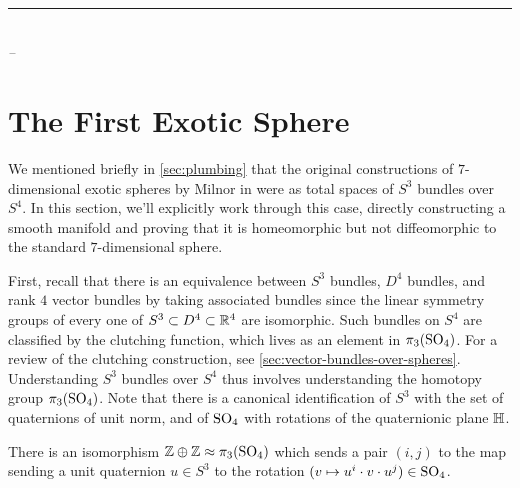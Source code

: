 \begin{flushleft}
	\textsl{}\\
	\rule[0pt]{15em}{0.5pt}\\
	\textsl{-- }
	\vspace{2em}
\end{flushleft}


\section{The First Exotic Sphere}\label{sec:first-exotic-sphere}

We mentioned briefly in \cref{sec:plumbing} that the original constructions of $7$-dimensional exotic spheres by Milnor in \cite{milnor1956manifolds} were as total spaces of $S^{3}$ bundles over $S^4$. In this section, we'll explicitly work through this case, directly constructing a smooth manifold and proving that it is homeomorphic but not diffeomorphic to the standard $7$-dimensional sphere.

First, recall that there is an equivalence between $S^3$ bundles, $D^4$ bundles, and rank $4$ vector bundles by taking associated bundles since the linear symmetry groups of every one of $S^3\subset D^4\subset \mathbb{R}^4$ are isomorphic. Such bundles on $S^4$ are classified by the clutching function, which lives as an element in $\pi_3({\operatorname{SO}}_4)$. For a review of the clutching construction, see \cref{sec:vector-bundles-over-spheres}. 
Understanding $S^3$ bundles over $S^4$ thus involves understanding the homotopy group $\pi_3({\operatorname{SO}}_4)$. Note that there is a canonical identification of $S^3$ with the set of quaternions of unit norm, and of ${\operatorname{SO}}_4$ with rotations of the quaternionic plane $\mathbb{H}$. 

\begin{proposition}
	There is an isomorphism $\mathbb{Z}\oplus \mathbb{Z}\approx \pi_3({\operatorname{SO}}_4)$ which sends a pair $(i,j)$ to the map sending a unit quaternion $u\in S^3$ to the rotation $(v\mapsto u^i\cdot v\cdot u^j)\in {\operatorname{SO}}_4$.
\end{proposition}

